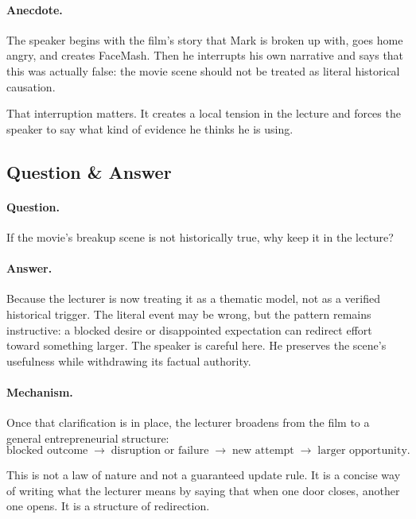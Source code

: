 \paragraph{Anecdote.}
The speaker begins with the film's story that Mark is broken up with, goes home angry, and creates FaceMash. Then he interrupts his own narrative and says that this was actually false: the movie scene should not be treated as literal historical causation.

That interruption matters. It creates a local tension in the lecture and forces the speaker to say what kind of evidence he thinks he is using.

\subsection{Question \& Answer}

\paragraph{Question.}
If the movie's breakup scene is not historically true, why keep it in the lecture?

\paragraph{Answer.}
Because the lecturer is now treating it as a thematic model, not as a verified historical trigger. The literal event may be wrong, but the pattern remains instructive: a blocked desire or disappointed expectation can redirect effort toward something larger. The speaker is careful here. He preserves the scene's usefulness while withdrawing its factual authority.

\paragraph{Mechanism.}
Once that clarification is in place, the lecturer broadens from the film to a general entrepreneurial structure:
\begin{equation}
\text{blocked outcome}
\;\longrightarrow\;
\text{disruption or failure}
\;\longrightarrow\;
\text{new attempt}
\;\longrightarrow\;
\text{larger opportunity}.
\end{equation}

This is not a law of nature and not a guaranteed update rule. It is a concise way of writing what the lecturer means by saying that when one door closes, another one opens. It is a structure of redirection.

